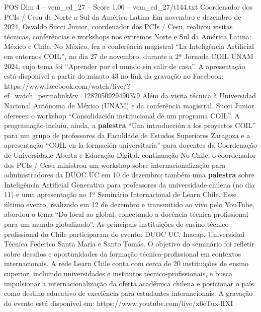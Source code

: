 \begin{textsample}{POS Dim 4 – vem\_ed\_27 – Score 1.00 – vem\_ed\_27/t144.txt}  \label{ex:f4_pos_022}
Coordenador dos PCIs / Cesu de Norte a Sul da América Latina Em novembro e dezembro de 2024, Osvaldo Succi Junior, coordenador dos PCIs / Cesu, realizou visitas técnicas, conferências e workshops nos extremos Norte e Sul da América Latina: México e Chile.
No México, fez a conferência magistral “La Inteligência Artificial em entornos COIL”, no dia 27 de novembro, durante a 2ª Jornada COIL UNAM 2024, cujo tema foi “Aprender por el mundo sin salir de casa”.
A apresentação está disponível a partir do minuto 43 no link da gravação no Facebook: https://www.facebook.com/watch/live/?ef=watch\_permalink\&v=1282050929490379 Além da visita técnica à Universidad Nacional Autónoma de México (UNAM) e da conferência magistral, Succi Junior ofereceu o workshop “Consolidación institucional de um programa COIL”.
A programação incluiu, ainda, a \textbf{palestra} “Una introducción a los proyectos COIL” para um grupo de professores da Faculdade de Estudos Superiores Zaragoza e a apresentação “COIL en la formación universitaria” para docentes da Coordenação de Universidade Aberta e Educação Digital. continuação No Chile, o coordenador dos PCIs / Cesu ministrou um workshop sobre internacionalização para administradores da DUOC UC em 10 de dezembro; também uma \textbf{palestra} sobre Inteligência Artificial Generativa para professores da universidade chilena (no dia 11) e uma apresentação no 1º Seminário Internacional de Learn Chile.
Esse último evento, realizado em 12 de dezembro e transmitido ao vivo pelo YouTube, abordou o tema “Do local ao global: conectando a docência técnica profissional para um mundo globalizado”.
As principais instituições de ensino técnico profissional do Chile participaram do evento: DUOC UC, Inacap, Universidad Técnica Federico Santa María e Santo Tomás.
O objetivo do seminário foi refletir sobre desafios e oportunidades da formação técnica-profissional em contextos internacionais.
A rede Learn Chile conta com cerca de 20 instituições de ensino superior, incluindo universidades e institutos técnico-profissionais, e busca impulsionar a internacionalização da oferta acadêmica chilena e posicionar o país como destino educativo de excelência para estudantes internacionais.
A gravação do evento está disponível em: https://www.youtube.com/live/x6eTux-lIXI

\end{textsample}
